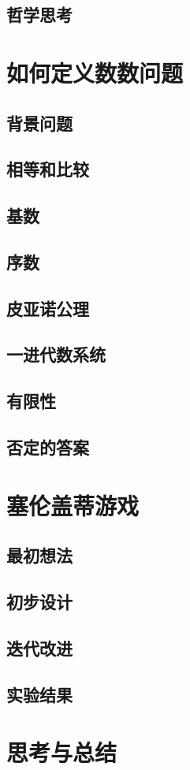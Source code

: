 \documentclass[a4paper,12pt]{article}
\begin{document}
\subsection{哲学思考}

\section{如何定义数数问题}

\subsection{背景问题}

\subsection{相等和比较}

\subsection{基数}

\subsection{序数}

\subsection{皮亚诺公理}

\subsection{一进代数系统}

\subsection{有限性}

\subsection{否定的答案}

\section{塞伦盖蒂游戏}

\subsection{最初想法}

\subsection{初步设计}

\subsection{迭代改进}

\subsection{实验结果}

\section{思考与总结}
\end{document}
